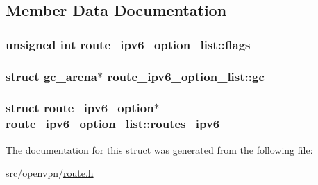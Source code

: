 \subsection{Member Data Documentation}
\hypertarget{structroute__ipv6__option__list_a04b38996423c8facdac8c843fae37a17}{}
\subsubsection[{flags}]{\setlength{\rightskip}{0pt plus 5cm}unsigned int route\+\_\+ipv6\+\_\+option\+\_\+list\+::flags}\label{structroute__ipv6__option__list_a04b38996423c8facdac8c843fae37a17}
\hypertarget{structroute__ipv6__option__list_a8dcffed95f93c2a93747de1d9e165999}{}
\subsubsection[{gc}]{\setlength{\rightskip}{0pt plus 5cm}struct {\bf gc\+\_\+arena}$\ast$ route\+\_\+ipv6\+\_\+option\+\_\+list\+::gc}\label{structroute__ipv6__option__list_a8dcffed95f93c2a93747de1d9e165999}
\hypertarget{structroute__ipv6__option__list_ae6e9d82445e90200af8a91ed3baadbec}{}
\subsubsection[{routes\+\_\+ipv6}]{\setlength{\rightskip}{0pt plus 5cm}struct {\bf route\+\_\+ipv6\+\_\+option}$\ast$ route\+\_\+ipv6\+\_\+option\+\_\+list\+::routes\+\_\+ipv6}\label{structroute__ipv6__option__list_ae6e9d82445e90200af8a91ed3baadbec}


The documentation for this struct was generated from the following file\+:\begin{DoxyCompactItemize}
\item 
src/openvpn/\hyperlink{route_8h}{route.\+h}\end{DoxyCompactItemize}
